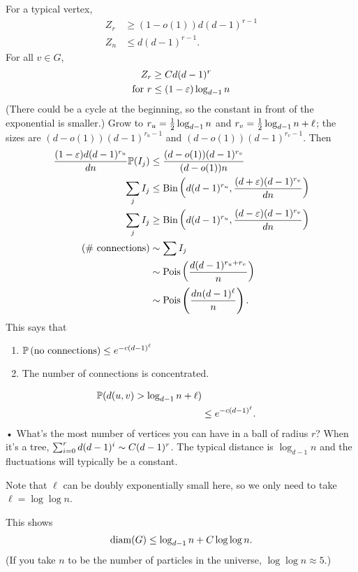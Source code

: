 For a typical vertex,
\begin{align}
Z_r &\ge (1-o(1)) d(d-1)^{r-1}\\
Z_n &\le d(d-1)^{r-1}.
\end{align}
For all $v\in G$,
\begin{align}
Z_r &\ge C d(d-1)^r\\
\text{for }r&\le (1-\varepsilon)\log_{d-1} n
\end{align}
(There could be a cycle at the beginning, so the constant in front of the exponential is smaller.)
Grow to $r_u=\frac{1}{2} \log_{d-1} n$ and $r_v = \frac{1}{2}\log_{d-1}n+\ell$; the sizes are $(d-o(1))(d-1)^{r_u-1}$ and $(d-o(1))(d-1)^{r_v-1}$.
Then
\begin{align}
\frac{(1-\varepsilon)d(d-1)^{r_u}}{dn}
\mathbb{P}(I_j) &\le \frac{(d-o(1))(d-1)^{r_v}}{(d-o(1))n}\\
\sum_j I_j &\le \operatorname{Bin}\left( {d(d-1)^{r_u} , \frac{(d+\varepsilon)(d-1)^{r_v}}{dn}} \right)\\
\sum_j I_j &\ge \operatorname{Bin} \left( {d(d-1)^{r_u} , \frac{(d-\varepsilon)(d-1)^{r_v}}{dn}} \right)\\
\left( \text{\# connections} \right) &\sim \sum I_j\\
&\sim \operatorname{Pois}\left( {\frac{d(d-1)^{r_u + r_v}}{n}} \right)\\
&\sim \operatorname{Pois} \left( {\frac{dn(d-1)^\ell}{n}} \right).
\end{align}
This says that
\begin{enumerate}
\item
$\mathbb{P}\left( \text{no connections} \right)\le e^{-c(d-1)^\ell}$
\item
The number of connections is concentrated.
\end{enumerate}
\begin{align}
\mathbb{P}(d(u,v)>\log_{d-1}n +\ell)\\
&\le e^{-c(d-1)^\ell}.
\end{align}•
What's the most number of vertices you can have in a ball of radius $r$? When it's a tree, 
$\sum_{i=0}^{r} d(d-1)^i \sim C(d-1)^r$.
The typical distance is $\log_{d-1}n$ and the fluctuations will typically be a constant.

Note that $\ell$ can be doubly exponentially small here, so we only need to take $\ell=\log\log n$.

This shows 
\begin{align}
\operatorname{diam}(G)\le \log_{d-1} n + C\log\log n.
\end{align}
(If you take $n$ to be the number of particles in the universe, $\log\log n\approx 5$.)

